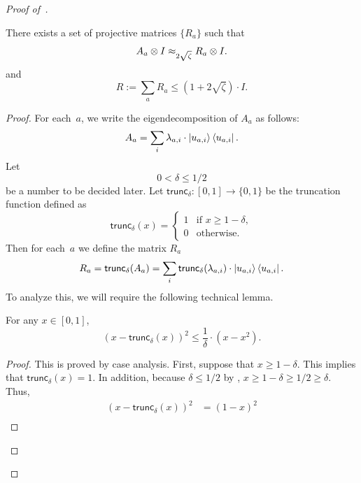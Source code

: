 \begin{proof}[Proof of~]
\begin{lemma}\label{lem:projective-non-measurement}
There exists a set of projective matrices $\{R_a\}$ such that
\begin{equation*}
A_a \otimes I \approx_{2\sqrt{\zeta}} R_a \otimes I.
\end{equation*}
and
\begin{equation*}
R:= \sum_a R_a \leq (1+2\sqrt{\zeta}) \cdot I.
\end{equation*}
\end{lemma}
\begin{proof}
For each~$a$, we write the eigendecomposition of $A_a$ as follows: 
\begin{equation*}
A_a = \sum_i \lambda_{a, i} \cdot\ket{u_{a, i}} \bra{u_{a, i}}.
\end{equation*}
Let
\begin{equation}\label{eq:bound-on-delta}
0 < \delta \leq 1/2
\end{equation}
be a number to be decided later.
Let $\mathsf{trunc}_\delta:[0, 1] \rightarrow \{0, 1\}$ be the truncation function defined as
\begin{equation*}
\mathsf{trunc}_\delta(x) =
\left\{\begin{array}{rl}
	1 & \text{if } x \geq 1- \delta,\\
	0 & \text{otherwise.}
	\end{array}\right.
\end{equation*}
Then for each~$a$ we define the matrix $R_a$
\begin{equation*}
R_a = \mathsf{trunc}_\delta(A_a) = \sum_i \mathsf{trunc}_\delta(\lambda_{a, i}) \cdot \ket{u_{a, i}} \bra{u_{a, i}}.
\end{equation*}
To analyze this, we will require the following technical lemma.
\begin{lemma}\label{lem:trunc-inequality}
For any $x \in [0, 1]$,
\begin{equation*}
(x - \mathsf{trunc}_\delta(x))^2 \leq \frac{1}{\delta} \cdot (x - x^2).
\end{equation*}
\end{lemma}
\begin{proof}
This is proved by case analysis.
First, suppose that $x \geq 1 - \delta$.
This implies that $\mathsf{trunc}_\delta(x) = 1$.
In addition, because $\delta \leq 1/2$ by ,
$
x \geq 1 - \delta \geq 1/2 \geq \delta.
$
Thus,
\begin{align*}
(x - \mathsf{trunc}_\delta(x))^2
& = (1-x)^2\\

\end{align*}
\end{proof}
\end{proof}
\end{proof}
